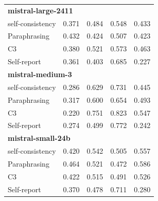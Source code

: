 \documentclass[11pt]{article}
\theoremstyle{plain}
\theoremstyle{definition}
\theoremstyle{remark}
\begin{document}
\begin{table}[p]
\begin{minipage}[t]{0.48\textwidth}
\begin{tabular}{lcccc}
        \multicolumn{5}{l}{\textbf{mistral-large-2411}} \\
        self-consistency & 0.371 & 0.484 & 0.548 & 0.433 \\
        Paraphrasing     & 0.432 & 0.424 & 0.507 & 0.423 \\
       C3             & 0.380 & 0.521 & 0.573 & 0.463 \\
        Self-report      & 0.361 & 0.403 & 0.685 & 0.227 \\
        \midrule
        \multicolumn{5}{l}{\textbf{mistral-medium-3}} \\
        self-consistency & 0.286 & 0.629 & 0.731 & 0.445 \\
        Paraphrasing     & 0.317 & 0.600 & 0.654 & 0.493 \\
       C3             & 0.220 & 0.751 & 0.823 & 0.547 \\
        Self-report      & 0.274 & 0.499 & 0.772 & 0.242 \\
        \midrule
        \multicolumn{5}{l}{\textbf{mistral-small-24b}} \\
        self-consistency & 0.420 & 0.542 & 0.505 & 0.557 \\
        Paraphrasing     & 0.464 & 0.521 & 0.472 & 0.586 \\
       C3             & 0.422 & 0.515 & 0.491 & 0.526 \\
        Self-report      & 0.370 & 0.478 & 0.711 & 0.280 \\
        \bottomrule
    \end{tabular}
\end{minipage}
\end{table}
\end{document}
